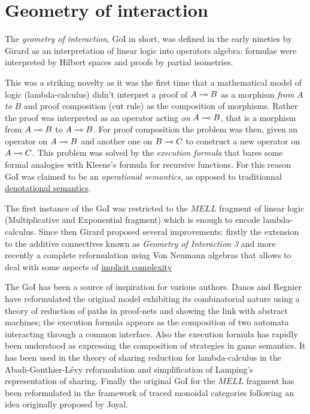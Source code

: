 \section{Geometry of interaction}\label{geometry-of-interaction}

The \emph{geometry of interaction}, GoI in short, was defined in the
early nineties by Girard as an interpretation of linear logic into
operators algebra: formulae were interpreted by Hilbert spaces and
proofs by partial isometries.

This was a striking novelty as it was the first time that a mathematical
model of logic (lambda-calculus) didn't interpret a proof of
\(A\multimap B\) as a morphism \emph{from} \(A\) \emph{to} \(B\) and proof
composition (cut rule) as the composition of morphisms. Rather the proof
was interpreted as an operator acting \emph{on} \(A\multimap B\), that is a
morphism from \(A\multimap B\) to \(A\multimap B\). For proof composition the
problem was then, given an operator on \(A\multimap B\) and another one on
\(B\multimap C\) to construct a new operator on \(A\multimap C\). This problem
was solved by the \emph{execution formula} that bares some formal
analogies with Kleene's formula for recursive functions. For this reason
GoI was claimed to be an \emph{operational semantics}, as opposed to
traditionnal \href{Semantics}{denotational semantics}.

The first instance of the GoI was restricted to the \(MELL\) fragment of
linear logic (Multiplicative and Exponential fragment) which is enough
to encode lambda-calculus. Since then Girard proposed several
improvements: firstly the extension to the additive connectives known as
\emph{Geometry of Interaction 3} and more recently a complete
reformulation using Von Neumann algebras that allows to deal with some
aspects of \href{Light_linear_logics}{implicit complexity}

The GoI has been a source of inspiration for various authors. Danos and
Regnier have reformulated the original model exhibiting its
combinatorial nature using a theory of reduction of paths in proof-nets
and showing the link with abstract machines; the execution formula
appears as the composition of two automata interacting through a common
interface. Also the execution formula has rapidly been understood as
expressing the composition of strategies in game semantics. It has been
used in the theory of sharing reduction for lambda-calculus in the
Abadi-Gonthier-Lévy reformulation and simplification of Lamping's
representation of sharing. Finally the original GoI for the \(MELL\)
fragment has been reformulated in the framework of traced monoidal
categories following an idea originally proposed by Joyal.


